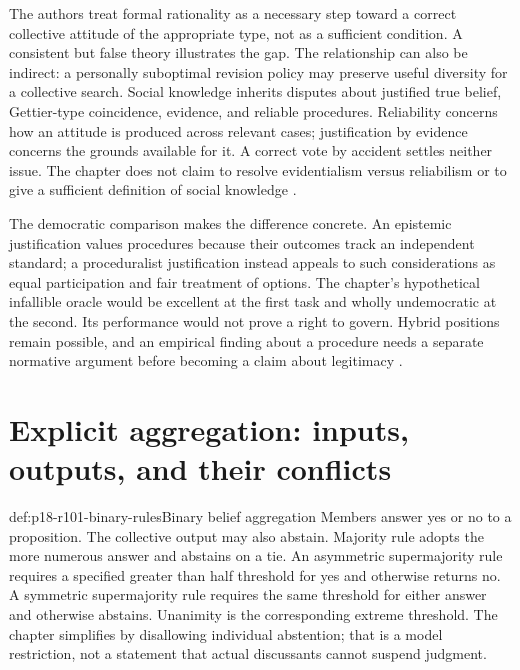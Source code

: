 The authors treat formal rationality as a necessary step toward a
correct collective attitude of the appropriate type, not as a sufficient
condition. A consistent but false theory illustrates the gap. The
relationship can also be indirect: a personally suboptimal revision policy
may preserve useful diversity for a collective search. Social knowledge
inherits disputes about justified true belief, Gettier-type coincidence,
evidence, and reliable procedures. Reliability concerns how an attitude
is produced across relevant cases; justification by evidence concerns the
grounds available for it. A correct vote by accident settles neither
issue. The chapter does not claim to resolve evidentialism versus
reliabilism or to give a sufficient definition of social knowledge
\parencite[p.~580 and n.~5, p.~587]{DietrichSpiekermann2021Social}.

The democratic comparison makes the difference concrete. An epistemic
justification values procedures because their outcomes track an
independent standard; a proceduralist justification instead appeals to
such considerations as equal participation and fair treatment of options.
The chapter's hypothetical infallible oracle would be excellent at the
first task and wholly undemocratic at the second. Its performance would
not prove a right to govern. Hybrid positions remain possible, and an
empirical finding about a procedure needs a separate normative argument
before becoming a claim about legitimacy
\parencite[pp.~580--581]{DietrichSpiekermann2021Social}.

\section{Explicit aggregation: inputs, outputs, and their conflicts}
\label{sec:p18-r101-aggregation}

\begin{hbdefinition}{def:p18-r101-binary-rules}{Binary belief aggregation}
Members answer yes or no to a proposition. The collective output may
also abstain. Majority rule adopts the more numerous answer and abstains
on a tie. An asymmetric supermajority rule requires a specified greater
than half threshold for yes and otherwise returns no. A symmetric
supermajority rule requires the same threshold for either answer and
otherwise abstains. Unanimity is the corresponding extreme threshold.
The chapter simplifies by disallowing individual abstention; that is a
model restriction, not a statement that actual discussants cannot suspend
judgment.
\end{hbdefinition}

